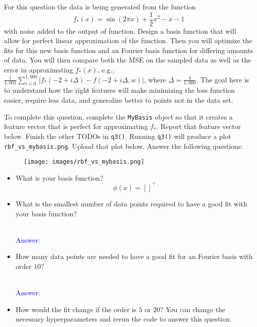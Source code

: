 \documentclass{article}
\begin{document}
\begin{enumerate}
    For this question the data is being generated from the function 
    \begin{equation}
        f_*(x) = \sin(2\pi x) + \frac{1}{2} x^2 - x - 1
    \end{equation}
    with noise added to the output of function. Design a basis function that will allow for perfect linear approximation of the function. Then you will optimize the fits for this new basis function and an Fourier basis function for differing amounts of data. You will then compare both the MSE on the sampled data as well as the error in approximating $f_*(x)$, e.g., $\frac{1}{1,\!001}\sum_{i=0}^{1,\!000}|f_*(-2+i\Delta) - f(-2+i\Delta, w)|$, where $\Delta = \frac{4}{1,\!000}$. The goal here is to understand how the right features will make minimizing the loss function easier, require less data, and generalize better to points not in the data set. 

    To complete this question, complete the \texttt{MyBasis} object so that it creates a feature vector that is perfect for approximating $f_*$. Report that feature vector below. Finish the other TODOs in \texttt{q3()}. Running \texttt{q3()} will produce a plot \texttt{rbf\_vs\_mybasis.png}. Upload that plot below. Answer the following questions: 
    \newpage
    \begin{figure}[htbp]
        \centering
        \texttt{[image: images/rbf\_vs\_mybasis.png]}
    \end{figure}
    
    \begin{itemize}
        \item What is your basis function? 
        \begin{equation}
            \phi(x) = \left [ \right ]^\top
        \end{equation}
        \item What is the smallest number of data points required to have a good fit with your basis function?
        
        \textcolor{blue}{\\Answer: }
        
        \item How many data points are needed to have a good fit for an Fourier basis with order $10$?

        \textcolor{blue}{\\Answer: }

        \item How would the fit change if the order is $5$ or $20$? You can change the necessary hyperparameters and rerun the code to answer this question. 
        

\end{itemize}
\end{enumerate}
\end{document}
